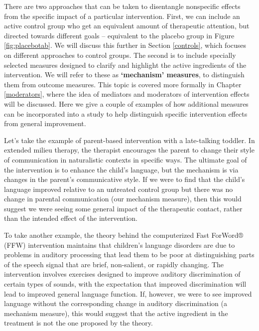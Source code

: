 \documentclass{krantz}
\begin{document}
There are two approaches that can be taken to disentangle nonspecific effects from the specific impact of a particular intervention. First, we can include an active control group who get an equivalent amount of therapeutic attention, but directed towards different goals -- equivalent to the placebo group in Figure \ref{fig:placebotab}. We will discuss this further in Section \ref{controls}, which focuses on different approaches to control groups. The second is to include specially selected measures designed to clarify and highlight the active ingredients of the intervention. We will refer to these as \textbf{`mechanism' measures}, to distinguish them from outcome measures. This topic is covered more formally in Chapter \ref{moderators}, where the idea of mediators and moderators of intervention effects will be discussed. Here we give a couple of examples of how additional measures can be incorporated into a study to help distinguish specific intervention effects from general improvement.

Let's take the example of parent-based intervention with a late-talking toddler. In extended milieu therapy, the therapist encourages the parent to change their style of communication in naturalistic contexts in specific ways. The ultimate goal of the intervention is to enhance the child's language, but the mechanism is via changes in the parent's communicative style. If we were to find that the child's language improved relative to an untreated control group but there was no change in parental communication (our mechanism measure), then this would suggest we were seeing some general impact of the therapeutic contact, rather than the intended effect of the intervention.

To take another example, the theory behind the computerized Fast ForWord® (FFW) intervention maintains that children's language disorders are due to problems in auditory processing that lead them to be poor at distinguishing parts of the speech signal that are brief, non-salient, or rapidly changing. The intervention involves exercises designed to improve auditory discrimination of certain types of sounds, with the expectation that improved discrimination will lead to improved general language function. If, however, we were to see improved language without the corresponding change in auditory discrimination (a mechanism measure), this would suggest that the active ingredient in the treatment is not the one proposed by the theory. 
\end{document}
